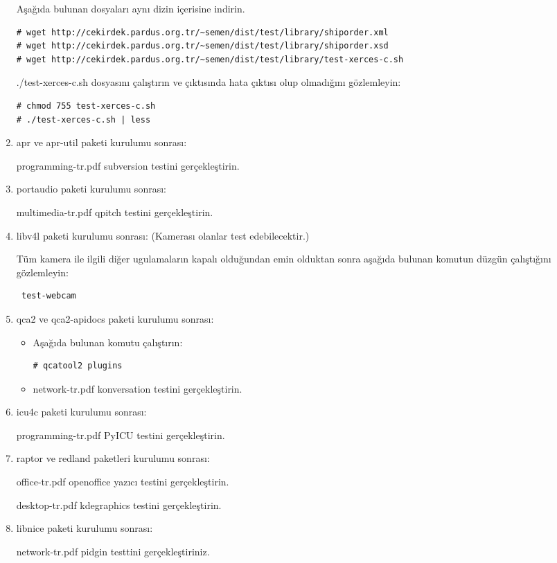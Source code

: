 \documentclass[a4paper,10pt]{article}
\begin{document}
\begin{enumerate}
Aşağıda bulunan dosyaları aynı dizin içerisine indirin.
\begin{verbatim}
# wget http://cekirdek.pardus.org.tr/~semen/dist/test/library/shiporder.xml
# wget http://cekirdek.pardus.org.tr/~semen/dist/test/library/shiporder.xsd
# wget http://cekirdek.pardus.org.tr/~semen/dist/test/library/test-xerces-c.sh
\end{verbatim}

./test-xerces-c.sh dosyasını çalıştırın ve çıktısında hata çıktısı olup olmadığını gözlemleyin:
\begin{verbatim}
# chmod 755 test-xerces-c.sh
# ./test-xerces-c.sh | less
\end{verbatim}

\item apr ve apr-util paketi kurulumu sonrası:

programming-tr.pdf subversion testini gerçekleştirin.

\item portaudio paketi kurulumu sonrası:

multimedia-tr.pdf qpitch testini gerçekleştirin.

\item libv4l paketi kurulumu sonrası: (Kamerası olanlar test edebilecektir.)

Tüm kamera ile ilgili diğer ugulamaların kapalı olduğundan emin olduktan sonra aşağıda bulunan komutun düzgün çalıştığını gözlemleyin:
\begin{verbatim}
 test-webcam
\end{verbatim}

\item qca2 ve qca2-apidocs paketi kurulumu sonrası:
\begin{itemize}
 \item Aşağıda bulunan komutu çalıştırın:
\begin{verbatim}
# qcatool2 plugins 
\end{verbatim}
\item network-tr.pdf konversation testini gerçekleştirin.
\end{itemize}


\item icu4c paketi kurulumu sonrası:

programming-tr.pdf PyICU testini gerçekleştirin.

\item raptor ve redland paketleri kurulumu sonrası:

office-tr.pdf openoffice yazıcı testini gerçekleştirin.

desktop-tr.pdf kdegraphics testini gerçekleştirin.

\item libnice paketi kurulumu sonrası:

network-tr.pdf pidgin testtini gerçekleştiriniz.
\end{enumerate}
\end{document}
